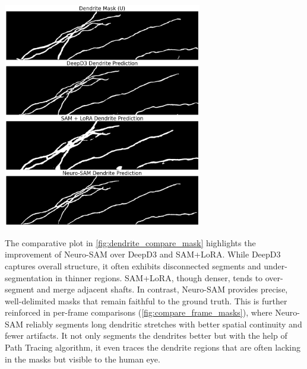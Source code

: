 \begin{center}
\includegraphics[width=0.65\textwidth]{figures/36_dendrite_compare_mask.png}
\label{fig:dendrite_compare_mask}
\end{center}

The comparative plot in \autoref{fig:dendrite_compare_mask} highlights the improvement of Neuro-\gls{SAM} over \gls{DeepD3} and \gls{SAM}+\gls{LoRA}. While \gls{DeepD3} captures overall structure, it often exhibits disconnected segments and under-segmentation in thinner regions. \gls{SAM}+\gls{LoRA}, though denser, tends to over-segment and merge adjacent shafts. In contrast, Neuro-\gls{SAM} provides precise, well-delimited masks that remain faithful to the ground truth. This is further reinforced in per-frame comparisons (\autoref{fig:compare_frame_masks}), where Neuro-\gls{SAM} reliably segments long dendritic stretches with better spatial continuity and fewer artifacts. It not only segments the dendrites better but with the help of Path Tracing algorithm, it even traces the dendrite regions that are often lacking in the masks but visible to the human eye. 

